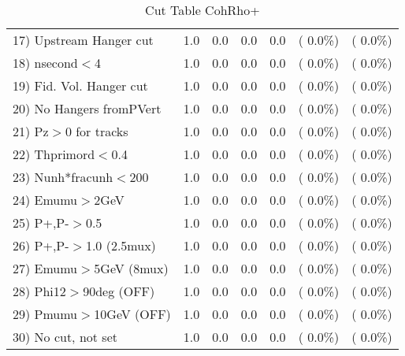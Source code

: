 \begin{table}[h!]
\begin{tabular}{||l||r|r|r|r|r|r||}
 17) Upstream Hanger cut  &          1.0 &          0.0 &          0.0 &          0.0 & (  0.0\%) & (  0.0\%) \\
 18) nsecond$<$4          &          1.0 &          0.0 &          0.0 &          0.0 & (  0.0\%) & (  0.0\%) \\
 19) Fid. Vol. Hanger cut &          1.0 &          0.0 &          0.0 &          0.0 & (  0.0\%) & (  0.0\%) \\
 20) No Hangers fromPVert &          1.0 &          0.0 &          0.0 &          0.0 & (  0.0\%) & (  0.0\%) \\
 21) Pz$>$0 for tracks    &          1.0 &          0.0 &          0.0 &          0.0 & (  0.0\%) & (  0.0\%) \\
 22) Thprimord$<$0.4      &          1.0 &          0.0 &          0.0 &          0.0 & (  0.0\%) & (  0.0\%) \\
 23) Nunh*fracunh$<$200   &          1.0 &          0.0 &          0.0 &          0.0 & (  0.0\%) & (  0.0\%) \\
 24) Emumu$>$2GeV         &          1.0 &          0.0 &          0.0 &          0.0 & (  0.0\%) & (  0.0\%) \\
 25) P+,P-$>$0.5          &          1.0 &          0.0 &          0.0 &          0.0 & (  0.0\%) & (  0.0\%) \\
 26) P+,P-$>$1.0 (2.5mux) &          1.0 &          0.0 &          0.0 &          0.0 & (  0.0\%) & (  0.0\%) \\
 27) Emumu$>$5GeV  (8mux) &          1.0 &          0.0 &          0.0 &          0.0 & (  0.0\%) & (  0.0\%) \\
 28) Phi12$>$90deg  (OFF) &          1.0 &          0.0 &          0.0 &          0.0 & (  0.0\%) & (  0.0\%) \\
 29) Pmumu$>$10GeV  (OFF) &          1.0 &          0.0 &          0.0 &          0.0 & (  0.0\%) & (  0.0\%) \\
 30) No cut, not set      &          1.0 &          0.0 &          0.0 &          0.0 & (  0.0\%) & (  0.0\%) \\
 \hline
 \hline
 \end{tabular}
 \caption{Cut Table  CohRho+  }
 \label{tab-cutcohjpsi-mumu_anumunc}
 \end{table}
